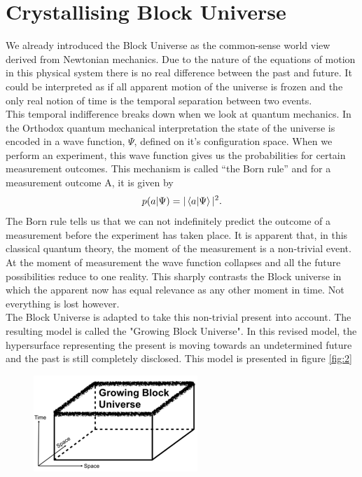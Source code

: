 \documentclass[11pt, a4 paper]{article}
\begin{document}
\section{Crystallising Block Universe}
\begin{multicols}{2}
We already introduced the Block Universe as the common-sense world view derived from Newtonian mechanics. Due to the nature of the equations of motion in this physical system there is no real difference between the past and future. It could be interpreted as if all apparent motion of the universe is frozen and the only real notion of time is the temporal separation between two events.\\
This temporal indifference breaks down when we look at quantum mechanics. In the Orthodox quantum mechanical interpretation the state of the universe is encoded in a wave function, $\Psi$, defined on it's configuration space. When we perform an experiment, this wave function gives us the probabilities for certain measurement outcomes. This mechanism is called ``the Born rule'' and for a measurement outcome A, it is given by
\begin{equation}
    p(a | \Psi) = |\bra{a} \ket{\Psi}|^2.
\end{equation}
The Born rule tells us that we can not indefinitely predict the outcome of a measurement before the experiment has taken place. It is apparent that, in this classical quantum theory, the moment of the measurement is a non-trivial event. At the moment of measurement the wave function collapses and all the future possibilities reduce to one reality. This sharply contrasts the Block universe in which the apparent now has equal relevance as any other moment in time. Not everything is lost however.\\
The  Block Universe is adapted to take this non-trivial present into account. The resulting model is called the "Growing Block Universe"\cite{dainton}. In this revised model, the hypersurface representing the present is moving towards an undetermined future and the past is still completely disclosed. This model is presented in figure \ref{fig:2}\\
\begin{figure}
\includegraphics[width=\linewidth]{growing_block.png}

\end{figure}
\end{multicols}
\end{document}
